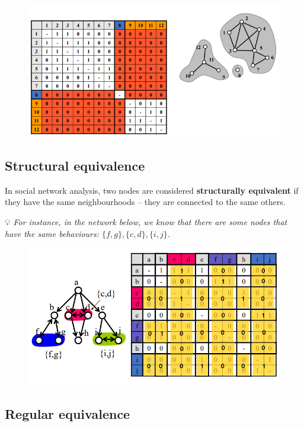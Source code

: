 \documentclass[
  notitlepage,
  onecolumn,
  openany]{book}
\begin{document}
\begin{figure}[h!]

{\centering \includegraphics[width=0.6\linewidth]{images/11-Subgroups and Structural Equivalence/Untitled 3} 

}

\end{figure}

\hypertarget{structural-equivalence}{%
\subsection{Structural equivalence}\label{structural-equivalence}}

In social network analysis, two nodes are considered \textbf{structurally equivalent} if they have the same neighbourhoods -- they are connected to the same others.

💡 \emph{For instance, in the network below, we know that there are some nodes that have the same behaviours: \(\{f, g\}, \{c, d\}, \{i, j\}\).}

\begin{figure}[h!]

{\centering \includegraphics[width=0.5\linewidth]{images/11-Subgroups and Structural Equivalence/Untitled 4} 

}

\end{figure}

\hypertarget{regular-equivalence}{%
\subsection{Regular equivalence}\label{regular-equivalence}}
\end{document}
